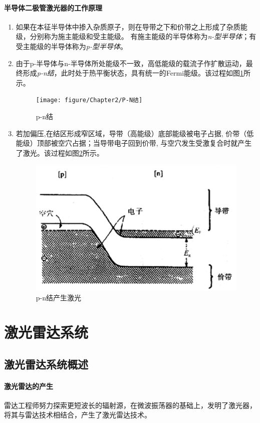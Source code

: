 \paragraph{半导体二极管激光器的工作原理}
\begin{enumerate}
	\item 如果在本征半导体中掺入杂质原子，则在导带之下和价带之上形成了杂质能级，分别称为施主能级和受主能级。
		有施主能级的半导体称为\textit{n-型半导体}；有受主能级的半导体称为\textit{p-型半导体}。
	\item 由于p-半导体与n-半导体所处能级不一致，高低能级的载流子作扩散运动，最终形成\textit{p-n结}，此时处于热平衡状态，具有统一的Fermi能级。该过程如图\ref{fig:p-n结}所示。
		\begin{figure}[htbp]
			\centering
			\texttt{[image: figure/Chapter2/P-N结]}
			\caption{p-n结}
			\label{fig:p-n结}
		\end{figure}
	\item 若加偏压,在结区形成窄区域，导带（高能级）底部能级被电子占据, 价带（低能级）顶部被空穴占据；当导带电子回到价带, 与空穴发生受激复合时就产生了激光。该过程如图\ref{fig:p-n结产生激光}所示。
		\begin{figure}[htbp]
			\centering
			\includegraphics[width=0.7\linewidth]{figure/Chapter2/p-n结产生激光}
			\caption{p-n结产生激光}
			\label{fig:p-n结产生激光}
		\end{figure}
\end{enumerate}

\section{激光雷达系统} %
\subsection{激光雷达系统概述} %

\paragraph{激光雷达的产生}雷达工程师努力探索更短波长的辐射源，在微波振荡器的基础上，发明了激光器，将其与雷达技术相结合，产生了激光雷达技术。

